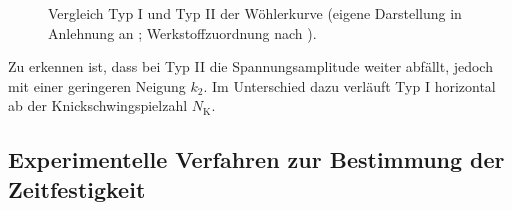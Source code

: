 \begin{figure}[H]
\caption{Vergleich Typ I und Typ II der Wöhlerkurve (eigene Darstellung in Anlehnung an \cite[Seite 18]{DIN50100}; Werkstoffzuordnung nach \cite[Seite 15--16]{DIN50100}).}
    \label{fig:vergleich_woehlerkurventypen}
\end{figure}

Zu erkennen ist, dass bei Typ II die Spannungsamplitude weiter abfällt, jedoch mit einer geringeren Neigung $k_2$. Im Unterschied dazu verläuft Typ I horizontal ab der Knickschwingspielzahl $N_{\text{K}}$. 

\clearpage

	\subsection{Experimentelle Verfahren zur Bestimmung der Zeitfestigkeit} \label{chap:Theorie_Zeitfestigkeit}
	

